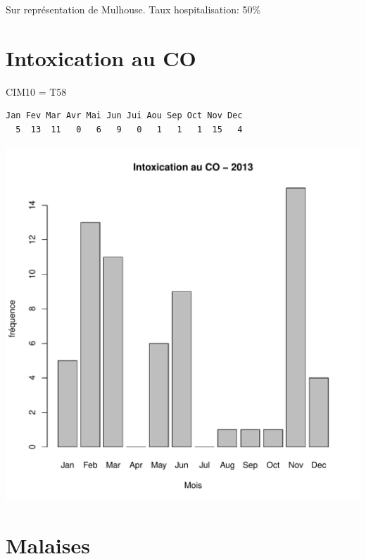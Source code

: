 \documentclass[12pt,english,french,twoside]{book}\usepackage[]{graphicx}\usepackage[]{color}
\makeatletter
\def\maxwidth{ %
  \ifdim\Gin@nat@width>\linewidth
    \linewidth
  \else
    \Gin@nat@width
  \fi
}
\newenvironment{kframe}{%
 \def\at@end@of@kframe{}%
 \ifinner\ifhmode%
  \def\at@end@of@kframe{\end{minipage}}%
  \begin{minipage}{\columnwidth}%
 \fi\fi%
 \def\FrameCommand##1{\hskip\@totalleftmargin \hskip-\fboxsep
 \colorbox{shadecolor}{##1}\hskip-\fboxsep
     \hskip-\linewidth \hskip-\@totalleftmargin \hskip\columnwidth}%
 \MakeFramed {\advance\hsize-\width
   \@totalleftmargin\z@ \linewidth\hsize
   \@setminipage}}%
 {\par\unskip\endMakeFramed%
 \at@end@of@kframe}
\newenvironment{knitrout}{}{} %
\makeatother
\begin{document}
Sur représentation de Mulhouse. 
Taux hospitalisation: 50\%


\section{Intoxication au CO}

CIM10 = T58

\begin{knitrout}
\color{fgcolor}\begin{kframe}
\begin{verbatim}
Jan Fev Mar Avr Mai Jun Jui Aou Sep Oct Nov Dec 
  5  13  11   0   6   9   0   1   1   1  15   4 
\end{verbatim}
\end{kframe}
\includegraphics[width=\maxwidth]{figure/co-1} 

\end{knitrout}


\section{Malaises}
\end{document}
